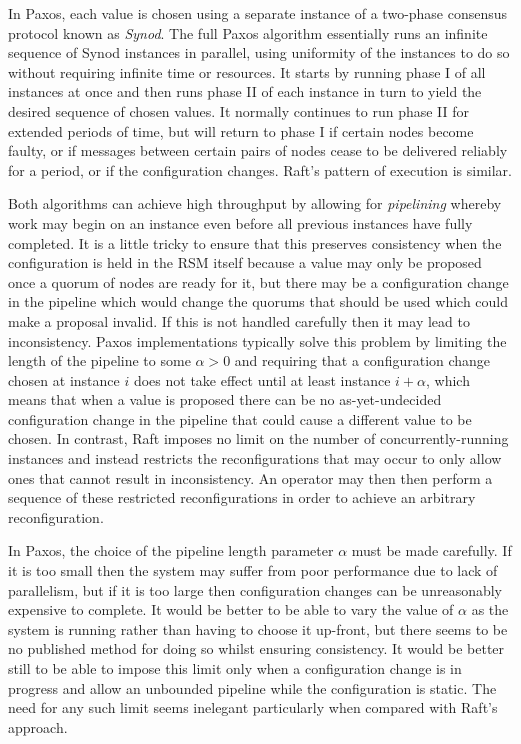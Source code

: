 \documentclass[journal]{IEEEtran}
\begin{document}
In Paxos, each value is chosen using a separate instance of a two-phase
consensus protocol known as \textit{Synod}. The full Paxos algorithm
essentially runs an infinite sequence of Synod instances in parallel, using
uniformity of the instances to do so without requiring infinite time or
resources.  It starts by running phase I of all instances at once and then runs
phase II of each instance in turn to yield the desired sequence of chosen
values. It normally continues to run phase II for extended periods of time, but
will return to phase I if certain nodes become faulty, or if messages between
certain pairs of nodes cease to be delivered reliably for a period, or if the
configuration changes.  Raft's pattern of execution is similar.

Both algorithms can achieve high throughput by allowing for \textit{pipelining}
\cite{smart} whereby work may begin on an instance even before all previous
instances have fully completed. It is a little tricky to ensure that this
preserves consistency when the configuration is held in the RSM itself because
a value may only be proposed once a quorum of nodes are ready for it, but there
may be a configuration change in the pipeline which would change the quorums
that should be used which could make a proposal invalid. If this is not handled
carefully then it may lead to inconsistency. Paxos implementations typically
solve this problem by limiting the length of the pipeline to some $\alpha > 0$
and requiring that a configuration change chosen at instance $i$ does not take
effect until at least instance $i + \alpha$, which means that when a value is
proposed there can be no as-yet-undecided configuration change in the pipeline
that could cause a different value to be chosen. In contrast, Raft imposes no
limit on the number of concurrently-running instances and instead restricts the
reconfigurations that may occur to only allow ones that cannot result in
inconsistency. An operator may then then perform a sequence of these restricted
reconfigurations in order to achieve an arbitrary reconfiguration.

In Paxos, the choice of the pipeline length parameter $\alpha$ must be made
carefully. If it is too small then the system may suffer from poor performance
due to lack of parallelism, but if it is too large then configuration changes
can be unreasonably expensive to complete. It would be better to be able to
vary the value of $\alpha$ as the system is running rather than having to
choose it up-front, but there seems to be no published method for doing so
whilst ensuring consistency. It would be better still to be able to impose this
limit only when a configuration change is in progress and allow an unbounded
pipeline while the configuration is static. The need for any such limit seems
inelegant\cite{reconfiguring-a-state-machine} particularly when compared with
Raft's approach.
\end{document}
